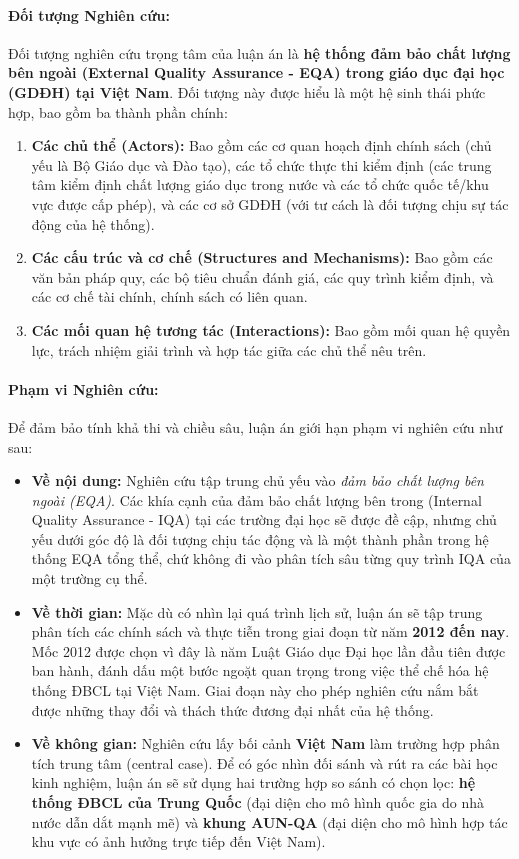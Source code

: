 \documentclass[12pt, a4paper, openany]{report}
\begin{document}
\paragraph{Đối tượng Nghiên cứu:}
Đối tượng nghiên cứu trọng tâm của luận án là \textbf{hệ thống đảm bảo chất lượng bên ngoài (External Quality Assurance - EQA) trong giáo dục đại học (GDĐH) tại Việt Nam}. Đối tượng này được hiểu là một hệ sinh thái phức hợp, bao gồm ba thành phần chính:
\begin{enumerate}
    \item \textbf{Các chủ thể (Actors):} Bao gồm các cơ quan hoạch định chính sách (chủ yếu là Bộ Giáo dục và Đào tạo), các tổ chức thực thi kiểm định (các trung tâm kiểm định chất lượng giáo dục trong nước và các tổ chức quốc tế/khu vực được cấp phép), và các cơ sở GDĐH (với tư cách là đối tượng chịu sự tác động của hệ thống).
    \item \textbf{Các cấu trúc và cơ chế (Structures and Mechanisms):} Bao gồm các văn bản pháp quy, các bộ tiêu chuẩn đánh giá, các quy trình kiểm định, và các cơ chế tài chính, chính sách có liên quan.
    \item \textbf{Các mối quan hệ tương tác (Interactions):} Bao gồm mối quan hệ quyền lực, trách nhiệm giải trình và hợp tác giữa các chủ thể nêu trên.
\end{enumerate}

\paragraph{Phạm vi Nghiên cứu:}
Để đảm bảo tính khả thi và chiều sâu, luận án giới hạn phạm vi nghiên cứu như sau:
\begin{itemize}
    \item \textbf{Về nội dung:} Nghiên cứu tập trung chủ yếu vào \textit{đảm bảo chất lượng bên ngoài (EQA)}. Các khía cạnh của đảm bảo chất lượng bên trong (Internal Quality Assurance - IQA) tại các trường đại học sẽ được đề cập, nhưng chủ yếu dưới góc độ là đối tượng chịu tác động và là một thành phần trong hệ thống EQA tổng thể, chứ không đi vào phân tích sâu từng quy trình IQA của một trường cụ thể.
    
    \item \textbf{Về thời gian:} Mặc dù có nhìn lại quá trình lịch sử, luận án sẽ tập trung phân tích các chính sách và thực tiễn trong giai đoạn từ năm \textbf{2012 đến nay}. Mốc 2012 được chọn vì đây là năm Luật Giáo dục Đại học lần đầu tiên được ban hành, đánh dấu một bước ngoặt quan trọng trong việc thể chế hóa hệ thống ĐBCL tại Việt Nam. Giai đoạn này cho phép nghiên cứu nắm bắt được những thay đổi và thách thức đương đại nhất của hệ thống.
    
    \item \textbf{Về không gian:} Nghiên cứu lấy bối cảnh \textbf{Việt Nam} làm trường hợp phân tích trung tâm (central case). Để có góc nhìn đối sánh và rút ra các bài học kinh nghiệm, luận án sẽ sử dụng hai trường hợp so sánh có chọn lọc: \textbf{hệ thống ĐBCL của Trung Quốc} (đại diện cho mô hình quốc gia do nhà nước dẫn dắt mạnh mẽ) và \textbf{khung AUN-QA} (đại diện cho mô hình hợp tác khu vực có ảnh hưởng trực tiếp đến Việt Nam).
\end{itemize}
\end{document}
